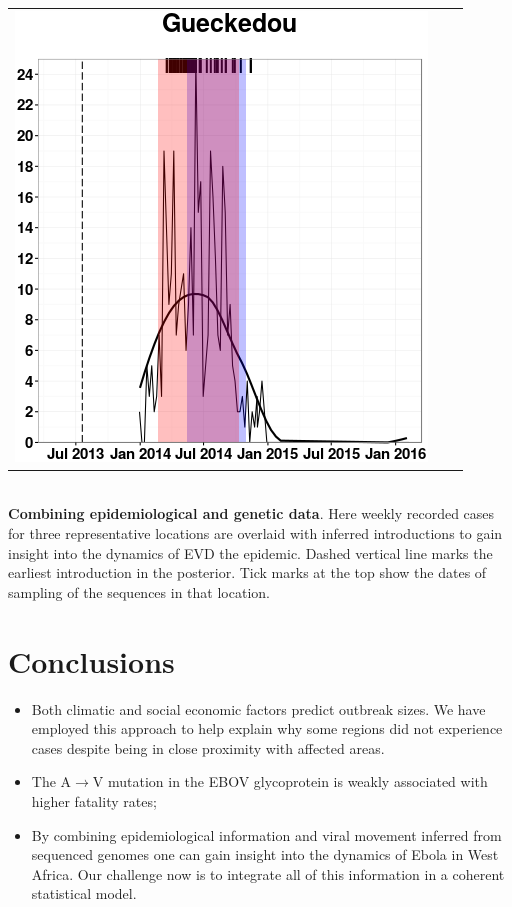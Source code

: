 \documentclass[portrait,a0paper,fontscale=0.315]{baposter}
\begin{document}
\begin{poster}
{\begin{tabular}{ccc}
 \includegraphics[scale=0.34,valign=c]{images/maxCases_Gueckedou.png}
\end{tabular}\\

\textbf{Combining epidemiological and genetic data}.
Here weekly recorded cases for three representative locations are overlaid with inferred introductions to gain insight into the dynamics of EVD the epidemic.
Dashed vertical line marks the earliest introduction in the posterior.
Tick marks at the top show the dates of sampling of the sequences in that location.

\section*{Conclusions}
\begin{itemize}
 \item Both climatic and social economic factors predict outbreak sizes.
 We have employed this approach to help explain why some regions did not experience cases despite being in close proximity with affected areas.
 \item The A$\rightarrow$V mutation in the EBOV glycoprotein is weakly associated with higher fatality rates;
 \item By combining epidemiological information and viral movement inferred from sequenced genomes one can gain insight into the dynamics of Ebola in West Africa.
 Our challenge now is to integrate all of this information in a coherent statistical model.
\end{itemize}

}
\end{poster}
\end{document}
